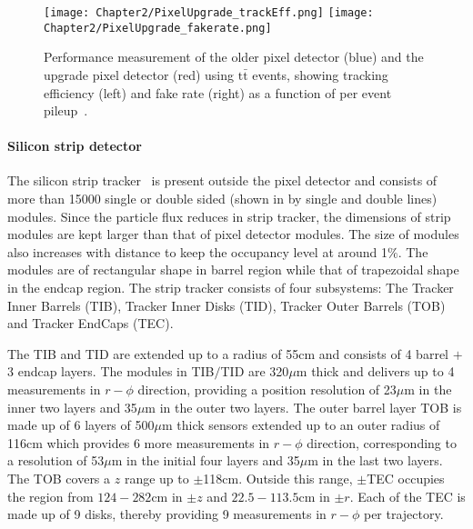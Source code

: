 \begin{figure}[h]
\begin{center}
\texttt{[image: Chapter2/PixelUpgrade\_trackEff.png]}
\texttt{[image: Chapter2/PixelUpgrade\_fakerate.png]}
\caption{Performance measurement of the older pixel detector (blue) and the upgrade pixel detector (red) using $\textrm{t}\bar{\textrm{t}}$ events,
  showing tracking efficiency (left) and fake rate (right) as a function of per event pileup~\cite{1748-0221-9-03-C03041}.}
\label{fig:Pixel_upgrade_effects}
\end{center}
\end{figure}

\paragraph {\bf{Silicon strip detector}}
\hspace{\parindent} The silicon strip tracker~\cite{Chatrchyan:2008aa,Karimaki:368412} is present outside the pixel detector
  and consists of more than 15000 single or double sided (shown in \fig{\ref{fig:CMS_tracker}} by single and double lines)
  modules. Since the particle flux reduces in strip tracker,
  the dimensions of strip modules are kept larger than that of pixel detector modules. The size of modules also increases with distance to keep the occupancy level
  at around 1$\%$. The modules are of rectangular shape in barrel region while that of trapezoidal shape in the endcap region.
  The strip tracker consists of four subsystems: The Tracker Inner Barrels (TIB), Tracker Inner Disks (TID), Tracker Outer Barrels (TOB) and
  Tracker EndCaps (TEC).

  The TIB and TID are extended up to a radius of 55\unit{cm} and consists of 4 barrel $+$ 3 endcap layers. The modules in TIB$/$TID are 320{$\mu${m}} thick and
  delivers up to 4 measurements in $r-\phi$ direction, providing a position resolution of 23{$\mu${m}} in the inner two layers and 35{$\mu${m}} in the outer two layers.
  The outer barrel layer TOB is made up of 6 layers of 500{$\mu${m}} thick sensors extended up to an outer radius of 116\unit{cm} which provides 6 more measurements
  in $r-\phi$ direction, corresponding to a resolution of 53{$\mu${m}} in the initial four layers and 35{$\mu${m}} in the last two layers.
  The TOB covers a $z$ range up to $\pm$118\unit{cm}.
  Outside this range, $\pm$TEC occupies the region from $124-282$\unit{cm} in ${\pm}z$ and $22.5-113.5$\unit{cm} in ${\pm}r$. Each of the TEC is made up of 9 disks, thereby
  providing 9 measurements in $r-\phi$ per trajectory. 

